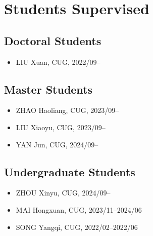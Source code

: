 \section{Students Supervised}

\subsection{Doctoral Students}
\begin{itemize}
\item LIU Xuan, CUG, 2022/09--
\end{itemize}

\subsection{Master Students}
\begin{itemize}
\item ZHAO Haoliang, CUG, 2023/09--
\item LIU Xiaoyu, CUG, 2023/09--
\item YAN Jun, CUG, 2024/09--
\end{itemize}

\subsection{Undergraduate Students}
\begin{itemize}
\item ZHOU Xinyu, CUG, 2024/09--
\item MAI Hongxuan, CUG, 2023/11--2024/06
\item SONG Yangqi, CUG, 2022/02--2022/06
\end{itemize}
